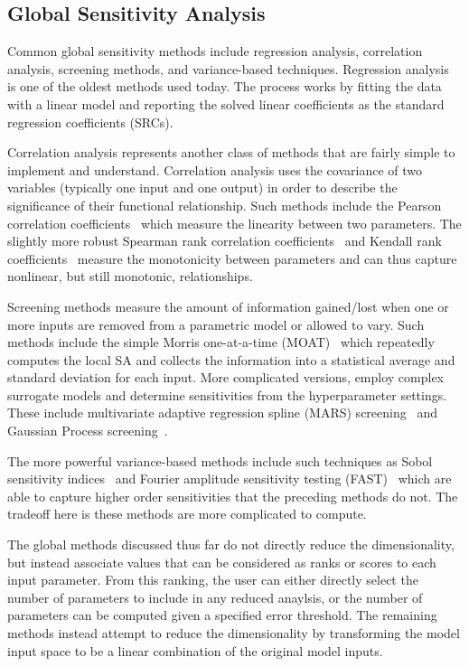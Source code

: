 \subsection{Global Sensitivity Analysis}

Common global sensitivity methods include regression analysis, correlation analysis, screening methods, and variance-based techniques.
%
Regression analysis~\cite{Galton1886} is one of the oldest methods used today.
%
The process works by fitting the data with a linear model and reporting the solved linear coefficients as the standard regression coefficients (SRCs).

Correlation analysis represents another class of methods that are fairly simple to implement and understand.
%
Correlation analysis uses the covariance of two variables (typically one input and one output) in order to describe the significance of their functional relationship.
%
Such methods include the Pearson correlation coefficients~\cite{Pearson1895} which measure the linearity between two parameters.
%
The slightly more robust Spearman rank correlation coefficients~\cite{Spearman1904a} and Kendall rank coefficients~\cite{KendallGibbons1990} measure the monotonicity between parameters and can thus capture nonlinear, but still monotonic, relationships.

Screening methods measure the amount of information gained/lost when one or more inputs are removed from a parametric model or allowed to vary.
%
Such methods include the simple Morris one-at-a-time (MOAT)~\cite{Morris1991} which repeatedly computes the local SA and collects the information into a statistical average and standard deviation for each input.
%
More complicated versions, employ complex surrogate models and determine sensitivities from the hyperparameter settings.
%
These include multivariate adaptive regression spline (MARS) screening~\cite{Friedman1991} and Gaussian Process screening~\cite{RasmussenWilliams2006}.

The more powerful variance-based methods include such techniques as Sobol sensitivity indices~\cite{Sobol1993} and Fourier amplitude sensitivity testing (FAST)~\cite{CukierFortuinShuler1973} which are able to capture higher order sensitivities that the preceding methods do not.
%
The tradeoff here is these methods are more complicated to compute.

The global methods discussed thus far do not directly reduce the dimensionality, but instead associate values that can be considered as ranks or scores to each input parameter.
%
From this ranking, the user can either directly select the number of parameters to include in any reduced anaylsis, or the number of parameters can be computed given a specified error threshold.
%
The remaining methods instead attempt to reduce the dimensionality by transforming the model input space to be a linear combination of the original model inputs.
%


